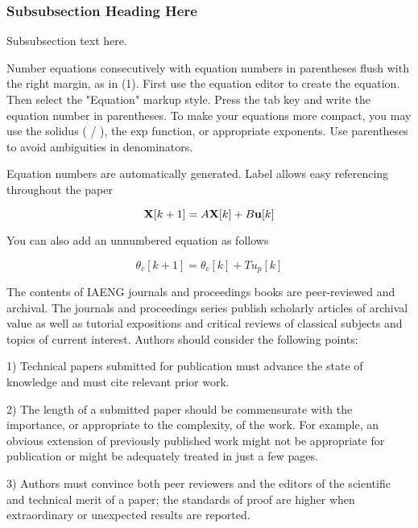 \documentclass[journal]{IAENGtran}
\begin{document}

\subsubsection{Subsubsection Heading Here}
Subsubsection text here.

Number equations consecutively with equation numbers in parentheses
flush with the right margin, as in (1). First use the equation
editor to create the equation. Then select the "Equation" markup
style. Press the tab key and write the equation number in
parentheses. To make your equations more compact, you may use the
solidus ( / ), the exp function, or appropriate exponents. Use
parentheses to avoid ambiguities in denominators.



Equation numbers are automatically generated.  Label allows easy
referencing throughout the paper

\begin{equation}
{\bf X}[k+1]=A{\bf X}[k]+B{\bf u}[k] \label{stateSpaceForm1}
\end{equation}


You can also add an unnumbered equation as follows

$$
\theta_c[k+1]=\theta_c[k]+Tu_p[k]
$$


The contents of IAENG journals and proceedings books are
peer-reviewed and archival. The journals and proceedings series
publish scholarly articles of archival value as well as tutorial
expositions and critical reviews of classical subjects and topics of
current interest. Authors should consider the following points:

1) Technical papers submitted for publication must advance the state
of knowledge and must cite relevant prior work.

2)  The length of a submitted paper should be commensurate with the
importance, or appropriate to the complexity, of the work. For
example, an obvious extension of previously published work might not
be appropriate for publication or might be adequately treated in
just a few pages.

3) Authors must convince both peer reviewers and the editors of the
scientific and technical merit of a paper; the standards of proof
are higher when extraordinary or unexpected results are reported.
\end{document}
